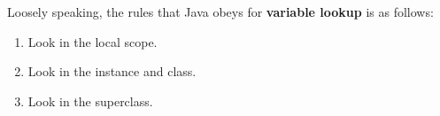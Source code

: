 Loosely speaking, the rules that Java obeys for \textbf{variable lookup} is as follows:

\begin{enumerate}
\item Look in the local scope.
\item Look in the instance and class.
\item Look in the superclass.
\end{enumerate}